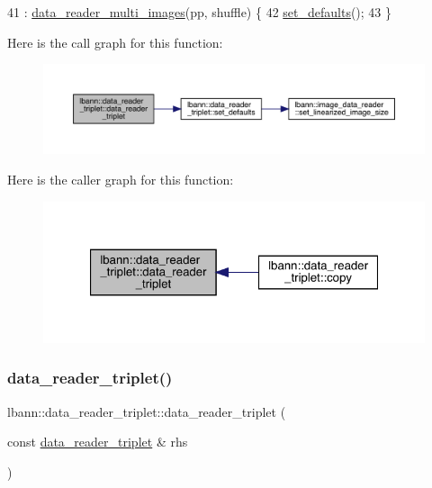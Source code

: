 \begin{DoxyCode}
41   : \hyperlink{classlbann_1_1data__reader__multi__images_a91725ae909007b26410837257aa921dc}{data\_reader\_multi\_images}(pp, shuffle) \{
42   \hyperlink{classlbann_1_1data__reader__triplet_a88bc385a2d42e9f78a768ff496036843}{set\_defaults}();
43 \}
\end{DoxyCode}
Here is the call graph for this function\+:\nopagebreak
\begin{figure}[H]
\begin{center}
\leavevmode
\includegraphics[width=350pt]{classlbann_1_1data__reader__triplet_ab0d6db1085010ea95fa1c01eccce0e6c_cgraph}
\end{center}
\end{figure}
Here is the caller graph for this function\+:\nopagebreak
\begin{figure}[H]
\begin{center}
\leavevmode
\includegraphics[width=321pt]{classlbann_1_1data__reader__triplet_ab0d6db1085010ea95fa1c01eccce0e6c_icgraph}
\end{center}
\end{figure}
\mbox{\label{classlbann_1_1data__reader__triplet_adf21708459fb3d4dbae1639ef02faeac}} 
\subsubsection{\texorpdfstring{data\+\_\+reader\+\_\+triplet()}{data\_reader\_triplet()}\hspace{0.1cm}{\footnotesize\ttfamily [2/2]}}
{\footnotesize\ttfamily lbann\+::data\+\_\+reader\+\_\+triplet\+::data\+\_\+reader\+\_\+triplet (\begin{DoxyParamCaption}\item[{const \hyperlink{classlbann_1_1data__reader__triplet}{data\+\_\+reader\+\_\+triplet} \&}]{rhs }\end{DoxyParamCaption})}



